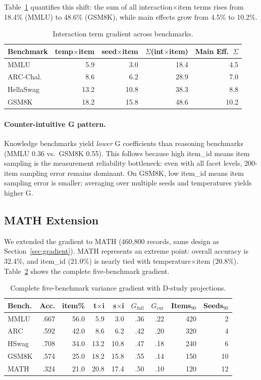 \documentclass[11pt]{article}
\begin{document}
Table~\ref{tab:interaction_gradient} quantifies this shift: the sum of all interaction$\times$item terms rises from 18.4\% (MMLU) to 48.6\% (GSM8K), while main effects grow from 4.5\% to 10.2\%.

\begin{table}[t]
\centering
\caption{Interaction term gradient across benchmarks.}
\label{tab:interaction_gradient}
\small
\begin{tabular}{lrrrr}
\toprule
Benchmark & temp$\times$item & seed$\times$item & $\Sigma$(int$\times$item) & Main Eff.\ $\Sigma$ \\
\midrule
MMLU & 5.9 & 3.0 & 18.4 & 4.5 \\
ARC-Chal. & 8.6 & 6.2 & 28.9 & 7.0 \\
HellaSwag & 13.2 & 10.8 & 38.3 & 8.8 \\
GSM8K & 18.2 & 15.8 & 48.6 & 10.2 \\
\bottomrule
\end{tabular}
\end{table}

\paragraph{Counter-intuitive G pattern.}
Knowledge benchmarks yield \emph{lower} G coefficients than reasoning benchmarks (MMLU 0.36 vs.\ GSM8K 0.55). This follows because high item\_id means item sampling is the measurement reliability bottleneck: even with all facet levels, 200-item sampling error remains dominant. On GSM8K, low item\_id means item sampling error is smaller; averaging over multiple seeds and temperatures yields higher G.

\subsection{MATH Extension}
\label{sec:math}

We extended the gradient to MATH (460{,}800 records, same design as Section~\ref{sec:gradient}). MATH represents an extreme point: overall accuracy is 32.4\%, and item\_id (21.0\%) is nearly tied with temperature$\times$item (20.8\%). Table~\ref{tab:5benchmark} shows the complete five-benchmark gradient.

\begin{table}[t]
\centering
\caption{Complete five-benchmark variance gradient with D-study projections.}
\label{tab:5benchmark}
\small
\begin{tabular}{lrrrrrrrr}
\toprule
Bench. & Acc. & item\% & t$\times$i & s$\times$i & $G_\text{full}$ & $G_\text{cur}$ & Items$_{90}$ & Seeds$_{90}$ \\
\midrule
MMLU & .667 & 56.0 & 5.9 & 3.0 & .36 & .22 & 420 & 2 \\
ARC & .592 & 42.0 & 8.6 & 6.2 & .42 & .20 & 320 & 4 \\
HSwag & .708 & 34.0 & 13.2 & 10.8 & .47 & .18 & 240 & 6 \\
GSM8K & .574 & 25.0 & 18.2 & 15.8 & .55 & .14 & 150 & 10 \\
MATH & .324 & 21.0 & 20.8 & 17.4 & .50 & .10 & 120 & 12 \\
\bottomrule
\end{tabular}
\end{table}
\end{document}
